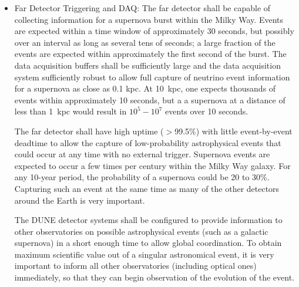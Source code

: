 \begin{itemize}


\item Far Detector Triggering and DAQ:  The far detector shall be capable of collecting information for a supernova burst within the Milky Way.  Events are expected within a time window of approximately 30 seconds, but possibly over an interval as long as several tens of seconds; a large fraction of the events are expected within approximately the first second of the burst.
The data acquisition buffers shall be sufficiently large and the data acquisition system sufficiently robust to allow full capture of neutrino event information for a supernova as close as 0.1 kpc.
At 10~kpc, one expects thousands of events within approximately 10 seconds, but a a supernova at a distance of less than 1~kpc would result in $10^5-10^7$  events over 10 seconds.    

The far detector shall have high uptime ($>$99.5\%) with little event-by-event deadtime to allow the capture of low-probability astrophysical events that could occur at any time with no external trigger. 
Supernova events are expected to occur a few times per century within the Milky Way galaxy. For any 10-year period, the probability of a supernova could be 20 to 30\%.  Capturing such an event at the same time as many of the other detectors around the Earth is very important.  

The DUNE detector systems shall be configured to provide  information to other observatories on possible astrophysical events (such as a galactic supernova) in a short enough time to allow global coordination.   
To obtain maximum scientific value out of a singular astronomical event, it is very important to inform all other observatories (including optical ones) immediately, so that they can begin observation of the evolution of the event. 


\end{itemize}

